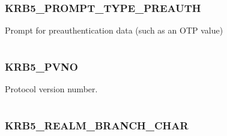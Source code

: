 \documentclass[letterpaper,10pt,english]{sphinxmanual}
\begin{document}
\subsubsection{KRB5\_PROMPT\_TYPE\_PREAUTH}
\label{appdev/refs/macros/KRB5_PROMPT_TYPE_PREAUTH:krb5-prompt-type-preauth-data}\label{appdev/refs/macros/KRB5_PROMPT_TYPE_PREAUTH::doc}\label{appdev/refs/macros/KRB5_PROMPT_TYPE_PREAUTH:krb5-prompt-type-preauth}

\begin{fulllineitems}
\label{appdev/refs/macros/KRB5_PROMPT_TYPE_PREAUTH:KRB5_PROMPT_TYPE_PREAUTH}
\end{fulllineitems}


Prompt for preauthentication data (such as an OTP value)

\begin{tabulary}{\linewidth}{|L|L|}
\hline

 & 
\\
\hline\end{tabulary}



\subsubsection{KRB5\_PVNO}
\label{appdev/refs/macros/KRB5_PVNO:krb5-pvno-data}\label{appdev/refs/macros/KRB5_PVNO::doc}\label{appdev/refs/macros/KRB5_PVNO:krb5-pvno}

\begin{fulllineitems}
\label{appdev/refs/macros/KRB5_PVNO:KRB5_PVNO}
\end{fulllineitems}


Protocol version number.

\begin{tabulary}{\linewidth}{|L|L|}
\hline

 & 
\\
\hline\end{tabulary}



\subsubsection{KRB5\_REALM\_BRANCH\_CHAR}
\label{appdev/refs/macros/KRB5_REALM_BRANCH_CHAR::doc}\label{appdev/refs/macros/KRB5_REALM_BRANCH_CHAR:krb5-realm-branch-char}\label{appdev/refs/macros/KRB5_REALM_BRANCH_CHAR:krb5-realm-branch-char-data}
\end{document}
